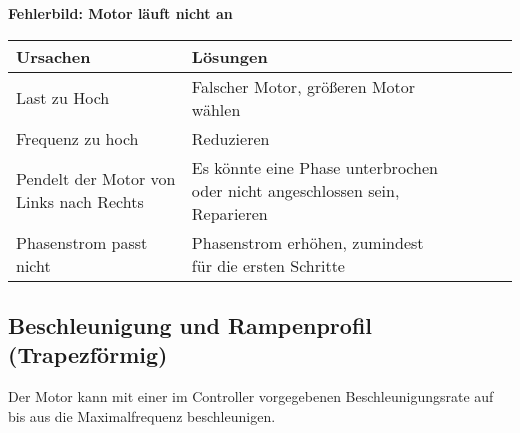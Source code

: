 {\textbf{Fehlerbild: Motor läuft nicht an} 
\begin{center}
	\fontsize{8}{10}\selectfont
	\begin{tabularx}{\textwidth}{|X|X|X|X|X|X|}
		\hline 
		\textbf{Ursachen} & \textbf{Lösungen} \\ \hline
	Last zu Hoch & Falscher Motor, größeren Motor wählen \\ \hline
		Frequenz zu hoch & Reduzieren\\ \hline
		Pendelt der Motor von Links nach Rechts & Es könnte eine Phase unterbrochen oder nicht angeschlossen sein, Reparieren \\ \hline
		Phasenstrom passt nicht & Phasenstrom erhöhen, zumindest für die ersten Schritte \\ \hline

	\end{tabularx}
		 \label{MOTLNA}
\end{center}


\subsection{Beschleunigung und Rampenprofil (Trapezförmig)}

Der Motor kann mit einer im Controller vorgegebenen Beschleunigungsrate auf bis aus die Maximalfrequenz beschleunigen.\cite{FaulhaberDriveSystems.2020} 

}

